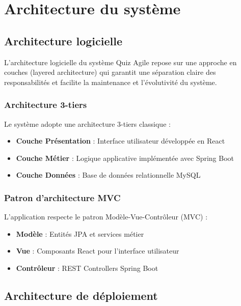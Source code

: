 \documentclass[12pt,a4paper]{report}
\begin{document}
\section{Architecture du système}

\subsection{Architecture logicielle}

L'architecture logicielle du système Quiz Agile repose sur une approche en couches (layered architecture) qui garantit une séparation claire des responsabilités et facilite la maintenance et l'évolutivité du système.

\subsubsection{Architecture 3-tiers}

Le système adopte une architecture 3-tiers classique :

\begin{itemize}
    \item \textbf{Couche Présentation} : Interface utilisateur développée en React
    \item \textbf{Couche Métier} : Logique applicative implémentée avec Spring Boot
    \item \textbf{Couche Données} : Base de données relationnelle MySQL
\end{itemize}

\subsubsection{Patron d'architecture MVC}

L'application respecte le patron Modèle-Vue-Contrôleur (MVC) :

\begin{itemize}
    \item \textbf{Modèle} : Entités JPA et services métier
    \item \textbf{Vue} : Composants React pour l'interface utilisateur
    \item \textbf{Contrôleur} : REST Controllers Spring Boot
\end{itemize}

\subsection{Architecture de déploiement}
\end{document}
